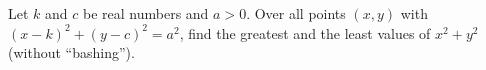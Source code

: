 Let $k$ and $c$ be real numbers and $a>0$. Over all points $(x,y)$ with $(x-k)^2+(y-c)^2=a^2$, find the greatest and the least values of $x^2+y^2$ (without ``bashing'').
